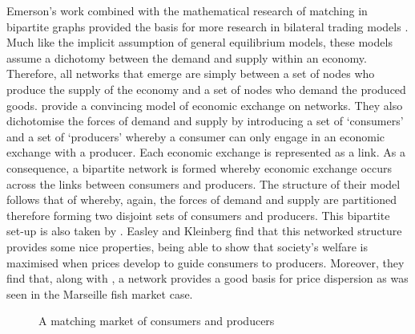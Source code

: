 Emerson's work combined with the mathematical research of matching in bipartite graphs \citep{Hall1935} provided the basis for more research in bilateral trading models \citep{Corominas-Bosch1999, Corominas-Bosch2004}. Much like the implicit assumption of general equilibrium models, these models assume a dichotomy between the demand and supply within an economy. Therefore, all networks that emerge are simply between a set of nodes who produce the supply of the economy and a set of nodes who demand the produced goods. \citet{Blume2009} provide a convincing model of economic exchange on networks. They also dichotomise the forces of demand and supply by introducing a set of `consumers' and a set of `producers' whereby a consumer can only engage in an economic exchange with a producer. Each economic exchange is represented as a link. As a consequence, a bipartite network is formed whereby economic exchange occurs across the links between consumers and producers. The structure of their model follows that of \citet{KrantonMinehart2001} whereby, again, the forces of demand and supply are partitioned therefore forming two disjoint sets of consumers and producers. This bipartite set-up is also taken by \citet[Chapter~10]{Jackson2008}. Easley and Kleinberg find that this networked structure provides some nice properties, being able to show that society's welfare is maximised when prices develop to guide consumers to producers. Moreover, they find that, along with \citet{Kakade2004a, Kakade2004b}, a network provides a good basis for price dispersion as was seen in the Marseille fish market case.

\begin{figure}[t]
\begin{center}
\end{center}
\caption{A matching market of consumers and producers}
\label{fig:bipartiteexchange}
\end{figure}

